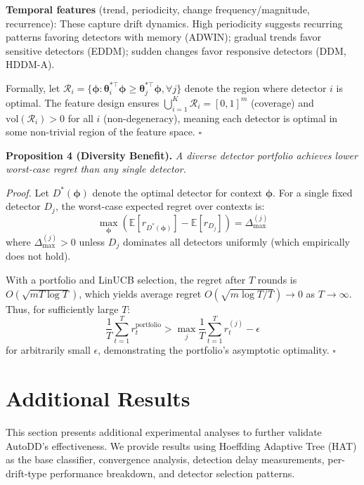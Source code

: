 \documentclass[11pt]{article}
\begin{document}
\textbf{Temporal features} (trend, periodicity, change frequency/magnitude, recurrence): These capture drift dynamics. High periodicity suggests recurring patterns favoring detectors with memory (ADWIN); gradual trends favor sensitive detectors (EDDM); sudden changes favor responsive detectors (DDM, HDDM-A).

Formally, let $\mathcal{R}_i = \{\boldsymbol{\phi} : \boldsymbol{\theta}_i^{*\top} \boldsymbol{\phi} \geq \boldsymbol{\theta}_j^{*\top} \boldsymbol{\phi}, \forall j\}$ denote the region where detector $i$ is optimal. The feature design ensures $\bigcup_{i=1}^K \mathcal{R}_i = [0,1]^m$ (coverage) and $\text{vol}(\mathcal{R}_i) > 0$ for all $i$ (non-degeneracy), meaning each detector is optimal in some non-trivial region of the feature space. \hfill $\square$



\textbf{Proposition 4 (Diversity Benefit).} \textit{A diverse detector portfolio achieves lower worst-case regret than any single detector.}

\textit{Proof.} Let $D^*(\boldsymbol{\phi})$ denote the optimal detector for context $\boldsymbol{\phi}$. For a single fixed detector $D_j$, the worst-case expected regret over contexts is:
\begin{equation}
\max_{\boldsymbol{\phi}} \left( \mathbb{E}[r_{D^*(\boldsymbol{\phi})}] - \mathbb{E}[r_{D_j}] \right) = \Delta_{\max}^{(j)}
\end{equation}
where $\Delta_{\max}^{(j)} > 0$ unless $D_j$ dominates all detectors uniformly (which empirically does not hold).

With a portfolio and LinUCB selection, the regret after $T$ rounds is $O(\sqrt{mT\log T})$, which yields average regret $O(\sqrt{m\log T/T}) \to 0$ as $T \to \infty$. Thus, for sufficiently large $T$:
\begin{equation}
\frac{1}{T}\sum_{t=1}^T r_t^{\text{portfolio}} > \max_j \frac{1}{T}\sum_{t=1}^T r_t^{(j)} - \epsilon
\end{equation}
for arbitrarily small $\epsilon$, demonstrating the portfolio's asymptotic optimality. \hfill $\square$

\section{Additional Results}\label{appendix:additional_results}

This section presents additional experimental analyses to further validate AutoDD's effectiveness. We provide results using Hoeffding Adaptive Tree (HAT) as the base classifier, convergence analysis, detection delay measurements, per-drift-type performance breakdown, and detector selection patterns.
\end{document}
